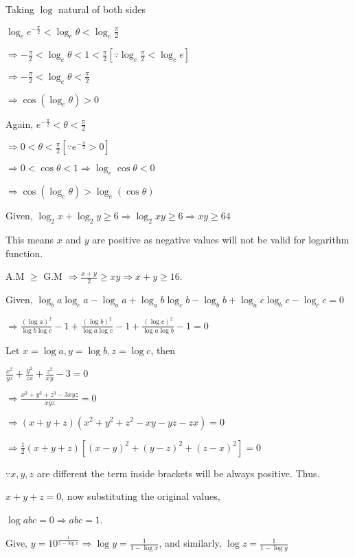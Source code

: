   Taking $\log$ natural of both sides

  $\log_ee^{-\tfrac{\pi}{2}} < \log_e\theta < \log_e\frac{\pi}{2}$

  $\Rightarrow -\frac{\pi}{2} < \log_e\theta < 1 < \frac{\pi}{2}\left[\because \log_e\tfrac{\pi}{2} < \log_ee\right]$

  $\Rightarrow -\frac{\pi}{2} < \log_e\theta < \frac{\pi}{2}$

  $\Rightarrow \cos(\log_e\theta) > 0$

  Again, $e^{-\tfrac{\pi}{2}} < \theta < \frac{\pi}{2}$

  $\Rightarrow 0 < \theta <\frac{\pi}{2} [\because e^{-\tfrac{\pi}{2}} > 0]$

  $\Rightarrow 0 < \cos\theta < 1 \Rightarrow \log_e\cos\theta < 0$

  $\Rightarrow \cos(\log_e\theta) > \log_e(\cos\theta)$
\item Given, $\log_2x + \log_2y \geq 6\Rightarrow \log_2xy \geq 6 \Rightarrow xy \geq 64$

  This means $x$ and $y$ are positive as negative values will not be valid for logarithm function.

  A.M $\geq$ G.M $\Rightarrow \frac{x + y}{2} \geq xy \Rightarrow x + y \geq 16$.
\item Given, $\log_ba\log_ca - \log_aa + \log_ab\log_cb - \log_bb + \log_ac\log_bc - \log_cc = 0$

  $\Rightarrow \frac{(\log a)^2}{\log b\log c} - 1 + \frac{(\log b)^2}{\log a\log c} - 1 + \frac{(\log c)^2}{\log a\log b} - 1 =0$

  Let $x = \log a, y = \log b, z = \log c$, then

  $\frac{x^2}{yz} + \frac{y^2}{zx} + \frac{z^2}{xy} - 3 = 0$

  $\Rightarrow \frac{x^3 + y^3 + z^3 - 3xyz}{xyz} = 0$

  $\Rightarrow (x + y + z)(x^2 + y^2 + z^2 - xy - yz - zx) = 0$

  $\Rightarrow \frac{1}{2}(x + y + z)[(x - y)^2 + (y - z)^2 + (z - x)^2] = 0$

  $\because x, y, z$ are different the term inside brackets will be always positive. Thus.

  $x + y + z = 0$, now substituting the original values,

  $\log abc = 0 \Rightarrow abc = 1$.
\item Give, $y = 10^{\frac{1}{1 - \log x}} \Rightarrow \log y = \frac{1}{1 - \log x}$, and similarly, $\log z = \frac{1}{1 - \log y}$

